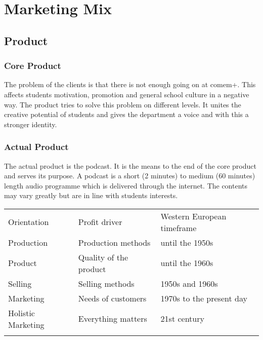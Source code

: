 \chapter{Marketing Mix}\label{marketing-mix}

\section{Product}\label{product}

\subsection{Core Product}\label{core-product}

The problem of the clients is that there is not enough going on at
comem+. This affects students motivation, promotion and general school
culture in a negative way. The product tries to solve this problem on
different levels. It unites the creative potential of students and gives
the department a voice and with this a stronger identity.

\subsection{Actual Product}\label{actual-product}

The actual product is the podcast. It is the means to the end of the
core product and serves its purpose. A podcast is a short (2 minutes) to
medium (60 minutes) length audio programme which is delivered through
the internet. The contents may vary greatly but are in line with
students interests.

\begin{longtable}[c]{@{}lll@{}}
\toprule\addlinespace
Orientation & Profit driver & Western European timeframe
\\\addlinespace
\midrule\endhead
Production & Production methods & until the 1950s
\\\addlinespace
Product & Quality of the product & until the 1960s
\\\addlinespace
Selling & Selling methods & 1950s and 1960s
\\\addlinespace
Marketing & Needs of customers & 1970s to the present day
\\\addlinespace
Holistic Marketing & Everything matters & 21st century
\\\addlinespace
\bottomrule
\end{longtable}

